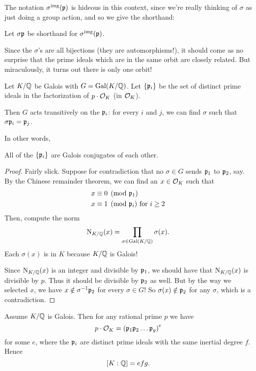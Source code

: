 The notation $\sigma^{\text{img}}(\mathfrak p)$ is hideous in this context,
since we're really thinking of $\sigma$ as just doing a group action,
and so we give the shorthand:
\begin{abuse}
	Let $\sigma\mathfrak p$ be shorthand for $\sigma^{\text{img}}(\mathfrak p)$.
\end{abuse}

Since the $\sigma$'s are all bijections (they are automorphisms!),
it should come as no surprise that the prime ideals which are in the same
orbit are closely related.
But miraculously, it turns out there is only one orbit!
\begin{theorem}
	Let $K/\mathbb Q$ be Galois with $G = \operatorname{Gal}(K/\mathbb Q)$.
	Let $\{\mathfrak p_i\}$ be the set of distinct prime ideals in
	the factorization of $p \cdot \mathcal O_K$ (in $\mathcal O_K$).

	Then $G$ acts transitively on the $\mathfrak p_i$:
	for every $i$ and $j$, we can find $\sigma$ such that $\sigma\mathfrak p_i = \mathfrak p_j$.
\end{theorem}
In other words,
\begin{moral}
	All of the $\{\mathfrak p_i\}$ are Galois conjugates of each other.
\end{moral}
\begin{proof}
	Fairly slick.
	Suppose for contradiction that no $\sigma \in G$ sends $\mathfrak p_1$ to $\mathfrak p_2$, say.
	By the Chinese remainder theorem, we can find an $x \in \mathcal O_K$ such that
	\begin{align*}
		x &\equiv 0 \pmod{\mathfrak p_1} \\
		x &\equiv 1 \pmod{\mathfrak p_i} \text{ for $i \ge 2$}
	\end{align*}
	Then, compute the norm
	\[ \operatorname{N}_{K/\mathbb Q}(x) = \prod_{\sigma \in \operatorname{Gal}(K/\mathbb Q)} \sigma(x). \]
	Each $\sigma(x)$ is in $K$ because $K/\mathbb Q$ is Galois!

	Since $\operatorname{N}_{K/\mathbb Q}(x)$ is an integer and divisible by $\mathfrak p_1$,
	we should have that $\operatorname{N}_{K/\mathbb Q}(x)$ is divisible by $p$.
	Thus it should be divisible by $\mathfrak p_2$ as well.
	But by the way we selected $x$, we have $x \notin \sigma^{-1}\mathfrak p_2$ for every $\sigma \in G$!
	So $\sigma(x) \notin \mathfrak p_2$ for any $\sigma$, which is a contradiction.
\end{proof}
\begin{theorem}
	Assume $K/\mathbb Q$ is Galois.
	Then for any rational prime $p$ we have
	\[ p \cdot \mathcal O_K = \left( \mathfrak p_1 \mathfrak p_2 \dots \mathfrak p_g \right)^e \]
	for some $e$, where the $\mathfrak p_i$ are distinct prime ideals
	with the same inertial degree $f$.
	Hence \[ [K:\mathbb Q] = efg. \]
\end{theorem}
